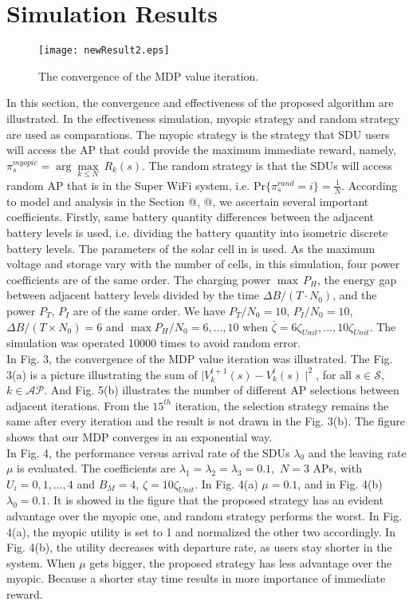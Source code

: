 \documentclass[conference]{IEEEtran}
\makeatletter
\newcommand{\Rmnum}[1]{\expandafter\@slowromancap\romannumeral #1@}
\makeatother
\begin{document}
\section{Simulation Results}
\begin{figure}
\centering
\texttt{[image: newResult2.eps]}\\
\caption{The convergence of the MDP value iteration.}
\end{figure}
In this section, the convergence and effectiveness of the proposed algorithm are illustrated. In the effectiveness simulation, myopic strategy and random strategy are used as comparations. The myopic strategy is the strategy that SDU users will access the AP that could provide the maximum immediate reward, namely, \(\pi_s^{myopic} = \arg \underset {k \leq N}{\max} \ R_{k}(s)\). The random strategy is that the SDUs will access random AP that is in the Super WiFi system, i.e. \(\mbox{Pr}\{\pi_s^{rand} = i\} = \frac {1} {N}\). According to model and analysis in the Section \Rmnum{2}, \Rmnum{3}, we ascertain several important coefficients. Firstly, same battery quantity differences between the adjacent battery levels is used, i.e. dividing the battery quantity into isometric discrete battery levels. The parameters of the solar cell in \cite{3} is used. As the maximum voltage and storage vary with the number of cells, in this simulation, four power coefficients are of the same order. The charging power \(\max \, P_{H}\), the energy gap between adjacent battery levels divided by the time \(\Delta B / (T \cdot N_0)\), and the power \(P_T\), \(P_I\) are of the same order. We have \(P_T / N_0 = 10\), \(P_I / N_0 = 10\), \(\Delta B / (T \times N_0) = 6\) and \(\max P_{H} / N_0 = 6,...,10\) when \(\bar{\zeta} = 6 \zeta_{Unit},...,10\zeta_{Unit}\). The simulation was operated 10000 times to avoid random error. \\
\indent In Fig. 3, the convergence of the MDP value iteration was illustrated. The Fig. 3(a) is a picture illustrating the sum of \(\mid V_k^{t+1}(s) - V_k^{t}(s)\mid^2\), for all \(s \in \mathcal{S}\), \(k \in \mathcal{AP}\). And Fig. 5(b) illustrates the number of different AP selections between adjacent iterations. From the \(15^{th}\) iteration, the selection strategy remains the same after every iteration and the result is not drawn in the Fig. 3(b). The figure shows that our MDP converges in an exponential way.\\
\indent In Fig. 4, the performance versus arrival rate of the SDUs \(\lambda_0\) and the leaving rate \(\mu\) is evaluated. The coefficients are \(\lambda_1 = \lambda_2 = \lambda_3 = 0.1\),\ \(N = 3\) APs, with \(U_i = 0, 1,...,4\) and \(B_M=4\), \(\zeta = 10 \zeta_{Unit}\). In Fig. 4(a) \(\mu = 0.1\), and in Fig. 4(b) \(\lambda_0 = 0.1\). It is showed in the figure that the proposed strategy has an evident advantage over the myopic one, and random strategy performs the worst. In Fig. 4(a), the myopic utility is set to 1 and normalized the other two accordingly. In Fig. 4(b), the utility decreases with departure rate, as users stay shorter in the system. When \(\mu\) gets bigger, the proposed strategy has less advantage over the myopic. Because a shorter stay time results in more importance of immediate reward.\\
\end{document}
